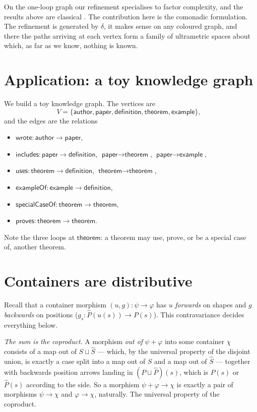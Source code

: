 \documentclass[11pt, a4paper]{article}
\theoremstyle{definition}
\theoremstyle{plain}
\begin{document}
On the one-loop graph our refinement specialises to factor
complexity, and the results above are classical
\cite{morsehedlund, cobham, christol}.  The contribution here is
the comonadic formulation.  The refinement is generated by $\delta$,
it makes sense on any coloured graph, and there the paths arriving
at each vertex form a family of ultrametric spaces about which,
as far as we know, nothing is known.

\section{Application: a toy knowledge graph}\label{sec:knowledge-graph}

We build a toy knowledge graph.  The vertices are
\[
  V = \{\textsf{author}, \textsf{paper}, \textsf{definition},
        \textsf{theorem}, \textsf{example}\},
\]
and the edges are the relations
\begin{itemize}
  \item $\textsf{wrote} : \textsf{author} \to \textsf{paper}$,
  \item $\textsf{includes} : \textsf{paper} \to \textsf{definition}$,
        $\textsf{paper} \to \textsf{theorem}$,
        $\textsf{paper} \to \textsf{example}$,
  \item $\textsf{uses} : \textsf{theorem} \to \textsf{definition}$,
        $\textsf{theorem} \to \textsf{theorem}$,
  \item $\textsf{exampleOf} : \textsf{example} \to \textsf{definition}$,
  \item $\textsf{specialCaseOf} : \textsf{theorem} \to \textsf{theorem}$,
  \item $\textsf{proves} : \textsf{theorem} \to \textsf{theorem}$.
\end{itemize}
Note the three loops at $\textsf{theorem}$: a theorem may use, prove,
or be a special case of, another theorem.

\appendix

\section{Containers are distributive}\label{app:distributive}

Recall that a container morphism $(u, g) : \psi \to \varphi$ has
$u$ \emph{forwards} on shapes and $g$ \emph{backwards} on positions
($g_s : \hat{P}(u(s)) \to P(s)$).  This contravariance decides
everything below.

\emph{The sum is the coproduct.}  A morphism \emph{out of}
$\psi + \varphi$ into some container $\chi$ consists of a map out
of $S \sqcup \hat{S}$ --- which, by the universal property of the
disjoint union, is exactly a case split into a map out of $S$ and a map
out of $\hat{S}$ --- together with backwards position arrows landing
in $(P \sqcup \hat{P})(s)$, which is $P(s)$ or $\hat{P}(s)$
according to the side.  So a morphism $\psi + \varphi \to \chi$
is exactly a pair of morphisms $\psi \to \chi$ and
$\varphi \to \chi$, naturally.  The universal property of the
coproduct.
\end{document}
